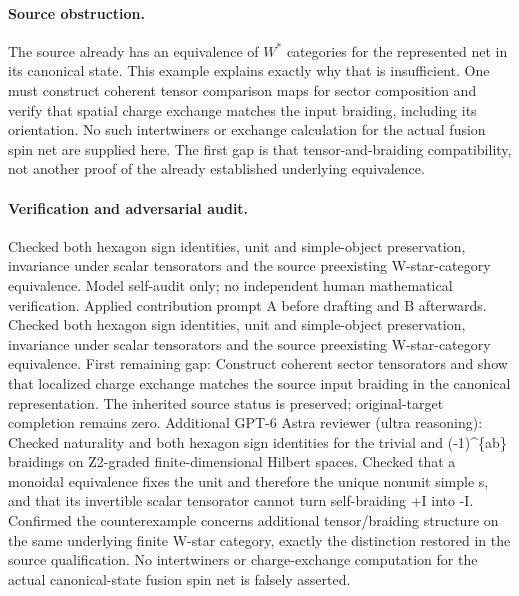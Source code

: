 \documentclass[11pt]{article}
\begin{document}
\paragraph{Source obstruction.} The source already has an equivalence of \(W^*\) categories for the represented net in its canonical state. This example explains exactly why that is insufficient. One must construct coherent tensor comparison maps for sector composition and verify that spatial charge exchange matches the input braiding, including its orientation. No such intertwiners or exchange calculation for the actual fusion spin net are supplied here. The first gap is that tensor-and-braiding compatibility, not another proof of the already established underlying equivalence.

\paragraph{Verification and adversarial audit.}
Checked both hexagon sign identities, unit and simple-object preservation, invariance under scalar tensorators and the source preexisting W-star-category equivalence. Model self-audit only; no independent human mathematical verification. Applied contribution prompt A before drafting and B afterwards. Checked both hexagon sign identities, unit and simple-object preservation, invariance under scalar tensorators and the source preexisting W-star-category equivalence. First remaining gap: Construct coherent sector tensorators and show that localized charge exchange matches the source input braiding in the canonical representation. The inherited source status is preserved; original-target completion remains zero. Additional GPT-6 Astra reviewer (ultra reasoning): Checked naturality and both hexagon sign identities for the trivial and (-1)\textasciicircum{}\{ab\} braidings on Z2-graded finite-dimensional Hilbert spaces. Checked that a monoidal equivalence fixes the unit and therefore the unique nonunit simple s, and that its invertible scalar tensorator cannot turn self-braiding +I into -I. Confirmed the counterexample concerns additional tensor/braiding structure on the same underlying finite W-star category, exactly the distinction restored in the source qualification. No intertwiners or charge-exchange computation for the actual canonical-state fusion spin net is falsely asserted.
\end{document}
